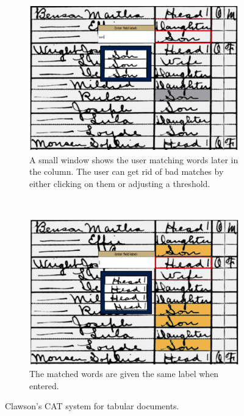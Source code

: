 \documentclass[ms]{byuprop}
\begin{document}
\begin{figure}
    \centering
    \begin{subfigure}[t]{0.46\textwidth}
    		\centering
    		\includegraphics[width=\textwidth]{ii_ex_a}
    		\caption{A small window shows the user matching words later in the column. The user can get rid of bad matches by either clicking on them or adjusting a  threshold.}
    	\end{subfigure}
    	~
    	\begin{subfigure}[t]{0.46\textwidth}
    		\centering
    		\includegraphics[width=\textwidth]{ii_ex_b}
    		\caption{The matched words are given the same label when entered.}
    	\end{subfigure}
    	\caption{Clawson's CAT system for tabular documents.}
    	\label{fig:ii}
\end{figure}
\end{document}
